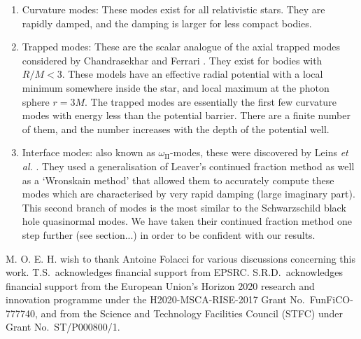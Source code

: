 \documentclass[aps,prd,longbibliography,reprint,twocolumn,amsmath,amssymb,amsfonts,showpacs,superscriptaddress]{revtex4-1}%
\begin{document}
	\begin{enumerate}
		\item Curvature modes: These modes exist for all relativistic stars. They are rapidly damped, and the damping is larger for less compact bodies.
		\item Trapped modes: These are the scalar analogue of the axial trapped modes considered by Chandrasekhar and Ferrari \cite{Chandrasekhar449}. They exist for bodies with $R/M < 3$. These models have an effective radial potential with a local minimum somewhere inside the star, and local maximum at the photon sphere $r=3M$. The trapped modes are essentially the first few curvature modes with energy less than the potential barrier. There are a finite number of them, and the number increases with the depth of the potential well.
		\item Interface modes: also known as $\omega_{\text{II}}$-modes, these were discovered by Leins \textit{et al.} \cite{Leins:1993zz}. They used a generalisation of Leaver's continued fraction  method as well as a `Wronskain method' that allowed them to accurately compute these modes which are characterised by very rapid damping (large imaginary part). This second branch of modes is the most similar to the Schwarzschild black hole quasinormal modes. We have taken their continued fraction method one step further (see section...) in order to be confident with our results.
	\end{enumerate}


\acknowledgments
M. O. E. H. wish to thank Antoine Folacci for various discussions concerning this work. T.S.~acknowledges financial support from EPSRC. S.R.D.~acknowledges financial support from the European Union's Horizon 2020 research and innovation programme under the H2020-MSCA-RISE-2017 Grant No.~FunFiCO-777740, and from the Science and Technology Facilities Council (STFC) under Grant No.~ST/P000800/1.





\end{document}
